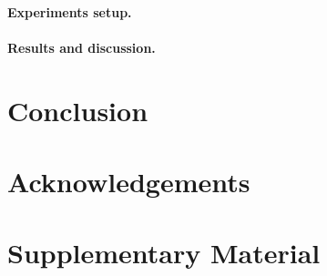 \documentclass[10pt,twocolumn,letterpaper]{article}
\begin{document}
\paragraph{Experiments setup.}

\paragraph{Results and discussion.}


\section{Conclusion} 



\section*{Acknowledgements}


\appendix
\section{Supplementary Material} 






{\small


}
\end{document}
